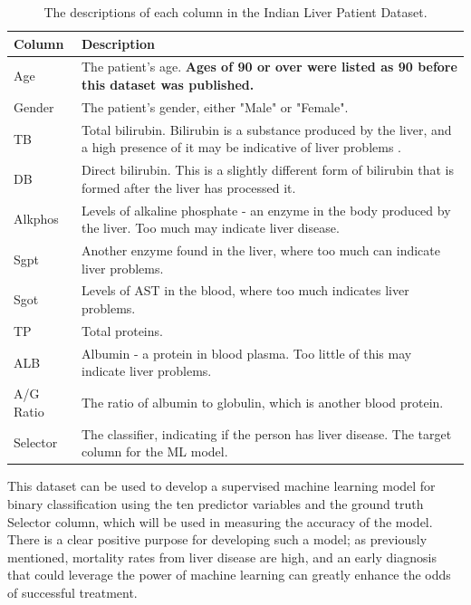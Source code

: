 \documentclass[12pt]{report}
\begin{document}
\begin{table}[H]
    \centering
        \begin{tabular}{ |p{}| p{}|}
            \hline
            \cellcolor{blue!25}Column & \cellcolor{blue!25}Description\\
            \hline
            Age & The patient's age. \textbf{Ages of 90 or over were listed as 90 before this dataset was published.} \\
            \hline
            Gender & The patient's gender, either "Male" or "Female".\\
            \hline
            TB & Total bilirubin. Bilirubin is a substance produced by the liver, and a high presence of it may be indicative of
            liver problems \autocite{mayo_clinic_bilirubin_nodate}.\\
            \hline
            DB & Direct bilirubin. This is a slightly different form of bilirubin that is formed after the liver has processed it.\\
            \hline
            Alkphos & Levels of alkaline phosphate - an enzyme in the body produced by the liver. Too much may indicate liver disease. \autocite{clevelandclinic_alkaline_nodate}\\
            \hline
            Sgpt & Another enzyme found in the liver, where too much can indicate liver problems.\\
            \hline
            Sgot & Levels of AST in the blood, where too much indicates liver problems.\\
            \hline
            TP & Total proteins.\\
            \hline
            ALB & Albumin - a protein in blood plasma. Too little of this may indicate liver problems.\\
            \hline
            A/G Ratio & The ratio of albumin to globulin, which is another blood protein.\\
            \hline
            Selector & The classifier, indicating if the person has liver disease. The target column for the ML model.\\
            \hline
    \end{tabular}
    \caption{The descriptions of each column in the Indian Liver Patient Dataset.}\label{tab:ILPD-Types}
\end{table}

This dataset can be used to develop a supervised machine learning model for binary classification using the ten predictor 
variables and the ground truth Selector column, which will be used in measuring the accuracy of the model. There is a clear 
positive purpose for developing such a model; as previously mentioned, mortality rates from liver disease are high, and an early
diagnosis that could leverage the power of machine learning can greatly enhance the odds of successful treatment.
\end{document}

